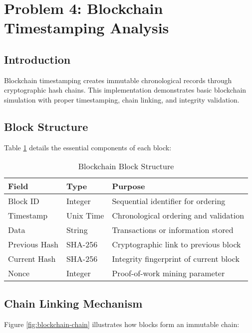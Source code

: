 \documentclass[12pt,a4paper]{article}
\begin{document}
\section{Problem 4: Blockchain Timestamping Analysis}

\subsection{Introduction}

Blockchain timestamping creates immutable chronological records through cryptographic hash chains. This implementation demonstrates basic blockchain simulation with proper timestamping, chain linking, and integrity validation.

\subsection{Block Structure}

Table \ref{tab:block-structure} details the essential components of each block:

\begin{table}[h]
\centering
\begin{tabular}{|l|l|p{6cm}|}
\hline
\textbf{Field} & \textbf{Type} & \textbf{Purpose} \\
\hline
Block ID & Integer & Sequential identifier for ordering \\
\hline
Timestamp & Unix Time & Chronological ordering and validation \\
\hline
Data & String & Transactions or information stored \\
\hline
Previous Hash & SHA-256 & Cryptographic link to previous block \\
\hline
Current Hash & SHA-256 & Integrity fingerprint of current block \\
\hline
Nonce & Integer & Proof-of-work mining parameter \\
\hline
\end{tabular}
\caption{Blockchain Block Structure}
\label{tab:block-structure}
\end{table}

\subsection{Chain Linking Mechanism}

Figure \ref{fig:blockchain-chain} illustrates how blocks form an immutable chain:
\end{document}
